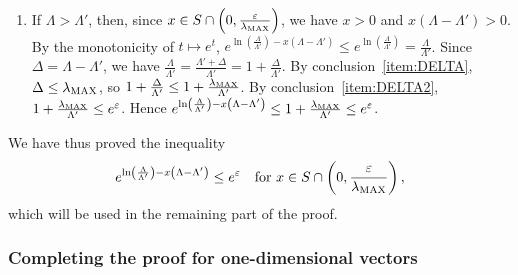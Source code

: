 \begin{enumerate}[label=\arabic*.]
\begin{enumerate}[label=(\alph*)]
    \item If $\Lambda > \Lambda'$, then, since $x \in S \cap \left(0, \frac{\varepsilon}{\lambda_{\mathrm{MAX}}}\right)$, we have $x > 0$ and $x(\Lambda - \Lambda') > 0$. By the monotonicity of $t \mapsto e^t$, $e^{\ln\left(\frac{\Lambda}{\Lambda'}\right) - x\left(\Lambda - \Lambda'\right)} \leq e^{\ln\left(\frac{\Lambda}{\Lambda'}\right)} = \frac{\Lambda}{\Lambda'}$. Since $\Delta = \Lambda - \Lambda'$, we have $\frac{\Lambda}{\Lambda'} = \frac{\Lambda' + \Delta}{\Lambda'} = 1 + \frac{\Delta}{\Lambda'}$. By conclusion~\ref{item:DELTA}, $\Delta \leq \lambda_{\mathrm{MAX}}$, so $1 + \frac{\Delta}{\Lambda'} \leq 1 + \frac{\lambda_{\mathrm{MAX}}}{\Lambda'}$. By conclusion~\ref{item:DELTA2}, $1 + \frac{\lambda_{\mathrm{MAX}}}{\Lambda'} \leq e^{\varepsilon}$. Hence $e^{\ln\left(\frac{\Lambda}{\Lambda'}\right) - x\left(\Lambda - \Lambda'\right)} \leq 1 + \frac{\lambda_{\mathrm{MAX}}}{\Lambda'} \leq e^{\varepsilon}$.
  \end{enumerate}
\end{enumerate}
We have thus proved the inequality
\begin{equation}
\label{eq:probability22}
e^{\ln\left(\frac{\Lambda}{\Lambda'}\right) - x\left(\Lambda - \Lambda'\right)} \leq e^{\varepsilon} \quad \text{for } x \in S \cap \left(0, \frac{\varepsilon}{\lambda_{\mathrm{MAX}}}\right),
\end{equation}
which will be used in the remaining part of the proof.

\subsubsection{Completing the proof for one-dimensional vectors}

